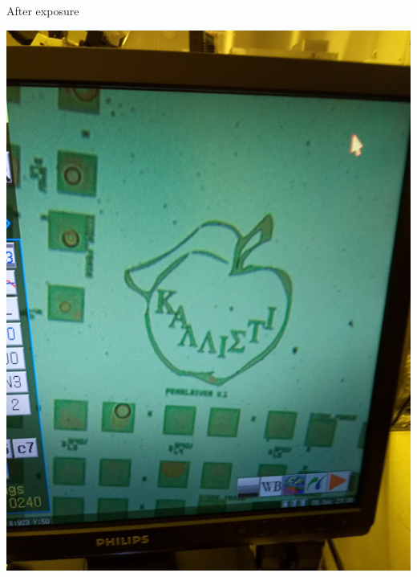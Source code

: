 \documentclass[aspectratio=169]{beamer}
\begin{document}
\begin{frame}{After exposure}
	\begin{center}
		\includegraphics[height=0.8\textheight]{images/20181210_125830_Burst01.jpg}

\end{center}
\end{frame}
\end{document}
